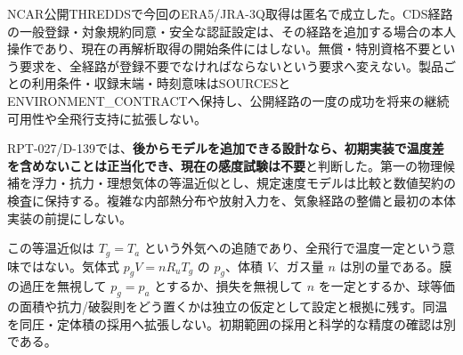 \documentclass[11pt,a4paper]{article}
\begin{document}
NCAR公開THREDDSで今回のERA5/JRA-3Q取得は匿名で成立した。CDS経路の一般登録・対象規約同意・安全な認証設定は、その経路を追加する場合の本人操作であり、現在の再解析取得の開始条件にはしない。無償・特別資格不要という要求を、全経路が登録不要でなければならないという要求へ変えない。製品ごとの利用条件・収録末端・時刻意味はSOURCESとENVIRONMENT\_CONTRACTへ保持し、公開経路の一度の成功を将来の継続可用性や全飛行支持に拡張しない。

RPT-027/D-139では、\textbf{後からモデルを追加できる設計なら、初期実装で温度差を含めないことは正当化でき、現在の感度試験は不要}と判断した。第一の物理候補を浮力・抗力・理想気体の等温近似とし、規定速度モデルは比較と数値契約の検査に保持する。複雑な内部熱分布や放射入力を、気象経路の整備と最初の本体実装の前提にしない。

この等温近似は \(T_g=T_a\)
という外気への追随であり、全飛行で温度一定という意味ではない。気体式
\(p_gV=nR_uT_g\) の \(p_g\)、体積 \(V\)、ガス量 \(n\)
は別の量である。膜の過圧を無視して \(p_g=p_a\) とするか、損失を無視して
\(n\)
を一定とするか、球等価の面積や抗力/破裂則をどう置くかは独立の仮定として設定と根拠に残す。同温を同圧・定体積の採用へ拡張しない。初期範囲の採用と科学的な精度の確認は別である。
\end{document}
